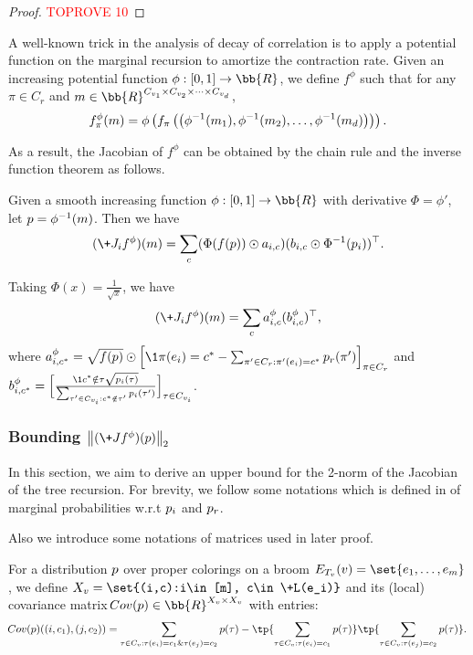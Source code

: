 \documentclass[a4paper,11pt]{article}
\renewcommand{\norm}[1]{\left\|#1\right\|}
\begin{document}
\begin{proof}\textcolor{red}{TOPROVE 10}\end{proof}

A well-known trick in the analysis of decay of correlation is to apply a potential function on the marginal recursion to amortize the contraction rate. Given an increasing  potential function $\phi:[0,1]\rightarrow \bb{R}$, we define $f^\phi$ such that for any $\pi \in C_r$ and $\*m \in \bb{R}^{C_{v_1}\times C_{v_2}\times \dots \times C_{v_d}}$,
\begin{equation*}
f^{\phi}_\pi(\*m)=\phi\left(f_\pi\left(\left(\phi^{-1}(\*m_{1}),\phi^{-1}(\*m_{2}),\dots, \phi^{-1}(\*m_{d})\right)\right)\right).
\end{equation*}

As a result, the Jacobian of $f^\phi$ can be obtained by the chain rule and the inverse function theorem as follows.
\begin{proposition}\label{prop:eq_of_Ji}
Given a smooth increasing function $\phi:[0,1]\rightarrow \bb{R}$ with derivative $\Phi = \phi'$, let $\*p = \phi^{-1}(\*m)$. Then we have
\begin{align*}
    (\+J_i f^{\phi})(\*m)=\sum_c (\Phi(f(\*p))\odot \*a_{i,c})(\*b_{i,c} \odot \Phi^{-1}(\*p_i))^{\top}.
\end{align*}
\end{proposition}
Taking $\Phi(x)=\frac{1}{\sqrt{x}}$, we have
\begin{align*}
    (\+J_i f^{\phi})(\*m)=\sum_c \*a^{\phi}_{i,c} (\*b^{\phi}_{i,c})^{\top},
\end{align*}
where $\*a^{\phi}_{i,c^*}=\sqrt{f(\*p)}\odot \Big[\1{\pi(e_i)=c^*}-\sum_{\pi' \in C_{r} : \pi'(e_i)=c^*}\*p_r(\pi')\Big]_{\pi\in C_r}$ and $\*b^{\phi}_{i,c^*}=\Big[\frac{\1{c^*\notin \tau}\sqrt{\*p_i(\tau)}}{\sum_{\tau' \in C_{v_i}: c^*\notin \tau'}\*p_i(\tau')}\Big]_{\tau\in C_{v_i}}$.

\subsubsection{Bounding $\norm{(\+J f^{\phi})(\*p)}_2$}

In this section, we aim to derive an upper bound for the 2-norm of the Jacobian of the tree recursion.
For brevity, we follow some notations which is defined in  of marginal probabilities w.r.t $\*p_i$ and $\*p_r$.


Also we introduce some notations of matrices used in later proof.
\begin{definition}\label{def:covariance}
    For a distribution $\*p$ over proper colorings on a broom $E_{T_v}(v)=\set{e_1,\dots,e_m}$, we define $X_v=\set{(i,c):i\in [m], c\in \+L(e_i)}$ and its (local) covariance matrix $ \!{Cov}(\*p)\in \bb{R}^{X_v\times X_v}$ with entries:
    $$ \!{Cov}(\*p)((i,c_1),(j,c_2)) = \sum_{\tau \in C_v:\tau(e_i)=c_1 \& \tau(e_j)=c_2} \*p(\tau)-\tp{\sum_{\tau \in C_v:\tau(e_i)=c_1}\*p(\tau)}\tp{\sum_{\tau \in C_v:\tau(e_j)=c_2}\*p(\tau)}.$$
\end{definition}
\end{document}
